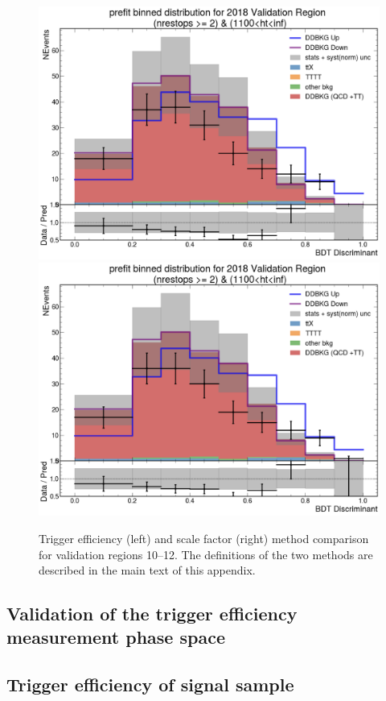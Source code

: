 \documentclass[twoside]{article}
\begin{document}
\begin{figure}[!t]
    \includegraphics[width=.45\columnwidth]{plots/Trigger/TriggerReview/eff12.png}
    \includegraphics[width=.45\columnwidth]{plots/Trigger/TriggerReview/SF12.png}

    \caption{
        Trigger efficiency (left) and scale factor (right) method comparison for validation regions 10–12.  
        The definitions of the two methods are described in the main text of this appendix.
    }
\end{figure}
\clearpage

\subsection{Validation of the trigger efficiency measurement phase space}

\subsection{Trigger efficiency of signal sample}



\end{document}
